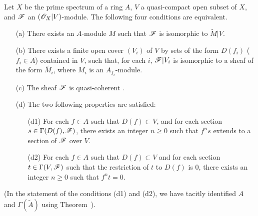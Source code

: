 \begin{theorem}[1.4.1]
\label{1.1.4.1}
Let $X$ be the prime spectrum of a ring $A$, $V$ a quasi-compact open subset of $X$, and $\mathscr{F}$ an $(\mathscr{O}_X|V)$-module.
The following four conditions are equivalent.
\begin{enumerate}
  \item[{\rm(a)}] There exists an $A$-module $M$ such that $\mathscr{F}$ is isomorphic to $\widetilde{M}|V$.
  \item[{\rm(b)}] There exists a finite open cover $(V_i)$ of $V$ by sets of the form $D(f_i)$ ($f_i\in A$) contained in $V$, such that, for each $i$, $\mathscr{F}|V_i$ is isomorphic to a sheaf of the form $\widetilde{M_i}$, where $M_i$ is an $A_{f_i}$-module.
  \item[{\rm(c)}] The sheaf $\mathscr{F}$ is quasi-coherent .
  \item[{\rm(d)}] The two following properties are satisfied:
    \begin{enumerate}
      \item[{\rm(d1)}] For each $f\in A$ such that $D(f)\subset V$, and for each section $s\in\Gamma(D(f),\mathscr{F})$, there exists an integer $n\geq 0$ such that $f^n s$ extends to a section of $\mathscr{F}$ over $V$.
      \item[{\rm(d2)}] For each $f\in A$ such that $D(f)\subset V$ and for each section $t\in\Gamma(V,\mathscr{F})$ such that the restriction of $t$ to $D(f)$ is $0$, there exists an integer $n\geq 0$ such that $f^n t=0$.
    \end{enumerate}
\end{enumerate}
\end{theorem}
(In the statement of the conditions (d1) and (d2), we have tacitly identified $A$ and $\Gamma(\widetilde{A})$ using Theorem~).

